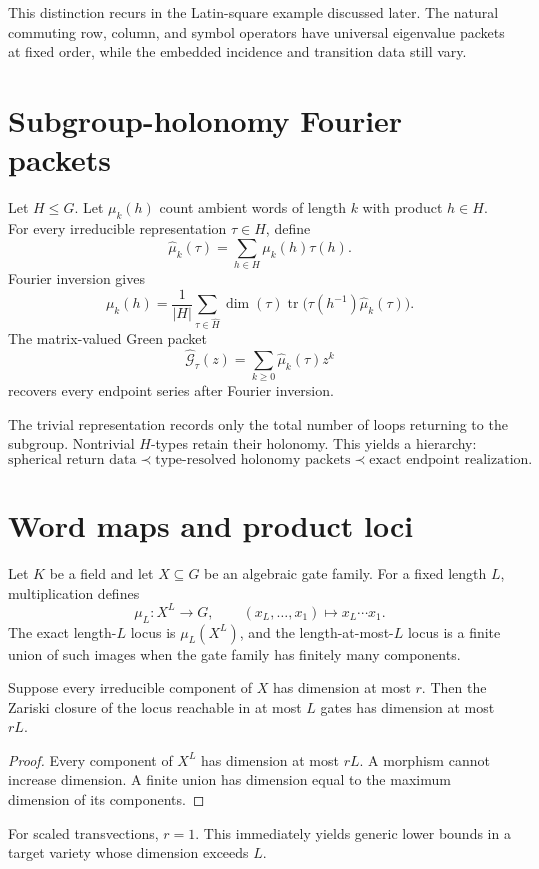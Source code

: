This distinction recurs in the Latin-square example discussed later.  The natural commuting row, column, and symbol operators have universal eigenvalue packets at fixed order, while the embedded incidence and transition data still vary.

\section{Subgroup-holonomy Fourier packets}
Let $H\le G$.  Let $\mu_k(h)$ count ambient words of length $k$ with product $h\in H$.  For every irreducible representation $\tau\in\widehat H$, define
\[
\widehat\mu_k(\tau)
=
\sum_{h\in H}\mu_k(h)\tau(h).
\]
Fourier inversion gives
\[
\mu_k(h)
=
\frac1{|H|}
\sum_{\tau\in\widehat H}
\dim(\tau)
\operatorname{tr}
\bigl(
\tau(h^{-1})\widehat\mu_k(\tau)
\bigr).
\]
The matrix-valued Green packet
\[
\widehat{\mathcal G}_\tau(z)
=
\sum_{k\ge0}\widehat\mu_k(\tau)z^k
\]
recovers every endpoint series after Fourier inversion.

The trivial representation records only the total number of loops returning to the subgroup.  Nontrivial $H$-types retain their holonomy.  This yields a hierarchy:
\[
\text{spherical return data}
\prec
\text{type-resolved holonomy packets}
\prec
\text{exact endpoint realization}.
\]

\section{Word maps and product loci}
Let $K$ be a field and let $X\subseteq G$ be an algebraic gate family.  For a fixed length $L$, multiplication defines
\[
\mu_L:X^L\to G,
\qquad
(x_L,\ldots,x_1)\mapsto x_L\cdots x_1.
\]
The exact length-$L$ locus is $\mu_L(X^L)$, and the length-at-most-$L$ locus is a finite union of such images when the gate family has finitely many components.

\begin{theorem}
Suppose every irreducible component of $X$ has dimension at most $r$.  Then the Zariski closure of the locus reachable in at most $L$ gates has dimension at most $rL$.
\end{theorem}
\begin{proof}
Every component of $X^L$ has dimension at most $rL$.  A morphism cannot increase dimension.  A finite union has dimension equal to the maximum dimension of its components.
\end{proof}

For scaled transvections, $r=1$.  This immediately yields generic lower bounds in a target variety whose dimension exceeds $L$.

